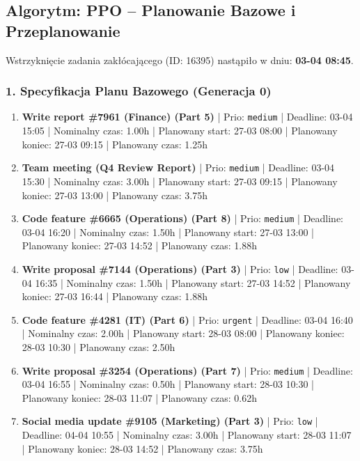 
\subsection{Algorytm: PPO -- Planowanie Bazowe i Przeplanowanie}

Wstrzyknięcie zadania zakłócającego (ID: 16395) nastąpiło w dniu: \textbf{03-04 08:45}.

\subsubsection*{1. Specyfikacja Planu Bazowego (Generacja 0)}
{\small
\begin{enumerate}
  \item [\textbf{14657}] \textbf{Write report \#7961 (Finance) (Part 5)} | Prio: \texttt{medium} | Deadline: 03-04 15:05 | Nominalny czas: 1.00h | Planowany start: 27-03 08:00 | Planowany koniec: 27-03 09:15 | Planowany czas: 1.25h
  \item [\textbf{14635}] \textbf{Team meeting (Q4 Review Report)} | Prio: \texttt{medium} | Deadline: 03-04 15:30 | Nominalny czas: 3.00h | Planowany start: 27-03 09:15 | Planowany koniec: 27-03 13:00 | Planowany czas: 3.75h
  \item [\textbf{14667}] \textbf{Code feature \#6665 (Operations) (Part 8)} | Prio: \texttt{medium} | Deadline: 03-04 16:20 | Nominalny czas: 1.50h | Planowany start: 27-03 13:00 | Planowany koniec: 27-03 14:52 | Planowany czas: 1.88h
  \item [\textbf{14702}] \textbf{Write proposal \#7144 (Operations) (Part 3)} | Prio: \texttt{low} | Deadline: 03-04 16:35 | Nominalny czas: 1.50h | Planowany start: 27-03 14:52 | Planowany koniec: 27-03 16:44 | Planowany czas: 1.88h
  \item [\textbf{14604}] \textbf{Code feature \#4281 (IT) (Part 6)} | Prio: \texttt{urgent} | Deadline: 03-04 16:40 | Nominalny czas: 2.00h | Planowany start: 28-03 08:00 | Planowany koniec: 28-03 10:30 | Planowany czas: 2.50h
  \item [\textbf{14663}] \textbf{Write proposal \#3254 (Operations) (Part 7)} | Prio: \texttt{medium} | Deadline: 03-04 16:55 | Nominalny czas: 0.50h | Planowany start: 28-03 10:30 | Planowany koniec: 28-03 11:07 | Planowany czas: 0.62h
  \item [\textbf{14698}] \textbf{Social media update \#9105 (Marketing) (Part 3)} | Prio: \texttt{low} | Deadline: 04-04 10:55 | Nominalny czas: 3.00h | Planowany start: 28-03 11:07 | Planowany koniec: 28-03 14:52 | Planowany czas: 3.75h

\end{enumerate}}
